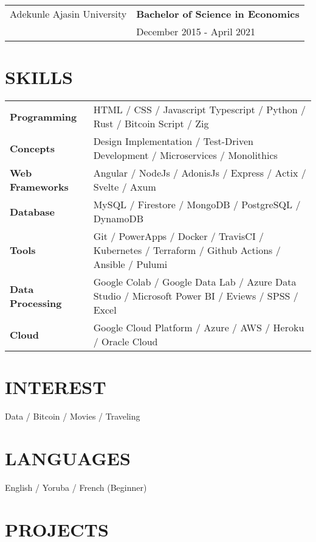 \documentclass[a4paper,12pt]{article}
\begin{document}
\begin{tabularx}{\linewidth}{@{}l X@{}}
Adekunle Ajasin University & \textbf{Bachelor of Science in Economics} \\
                          & December 2015 - April 2021 \\[10pt]
\end{tabularx}

\section{SKILLS}

\begin{tabularx}{\linewidth}{@{}l X@{}}
\textbf{Programming} & HTML / CSS / Javascript Typescript / Python / Rust / Bitcoin Script / Zig \\
\textbf{Concepts} & Design Implementation / Test-Driven Development / Microservices / Monolithics \\
\textbf{Web Frameworks} & Angular / NodeJs / AdonisJs / Express / Actix / Svelte / Axum \\
\textbf{Database} & MySQL / Firestore / MongoDB / PostgreSQL / DynamoDB \\
\textbf{Tools} & Git / PowerApps / Docker / TravisCI / Kubernetes / Terraform / Github Actions / Ansible / Pulumi  \\
\textbf{Data Processing} & Google Colab / Google Data Lab / Azure Data Studio / Microsoft Power BI / Eviews / SPSS / Excel \\
\textbf{Cloud} & Google Cloud Platform / Azure / AWS / Heroku / Oracle Cloud
\end{tabularx}

\section{INTEREST}
Data / Bitcoin / Movies / Traveling

\section{LANGUAGES}
English / Yoruba / French (Beginner)

\section{PROJECTS}
\end{document}
